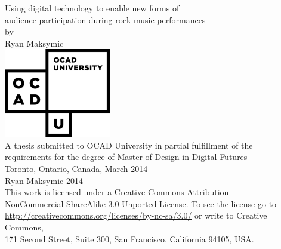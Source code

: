 \begin{titlepage}
\begin{center}

\LARGE{Using digital technology to enable new forms of\\audience participation during rock music performances}\\[0.5cm]
\large{by\\[0.5cm]
Ryan Maksymic}\\[2cm]
\includegraphics[width=0.35\textwidth]{ocadu_logo.png}\\[1.5cm]
\small{A thesis submitted to OCAD University in partial fulfillment of the\\
requirements for the degree of Master of Design in Digital Futures\\[1cm]
Toronto, Ontario, Canada, March 2014\\[1cm]
\ccLogo \hspace{0.05cm} Ryan Maksymic 2014\\[0.5cm]
This work is licensed under a Creative Commons Attribution-\\NonCommercial-ShareAlike 3.0 Unported License. To see the license go to \url{http://creativecommons.org/licenses/by-nc-sa/3.0/} or write to Creative Commons,\\171 Second Street, Suite 300, San Francisco, California 94105, USA.}

\end{center}
\end{titlepage}